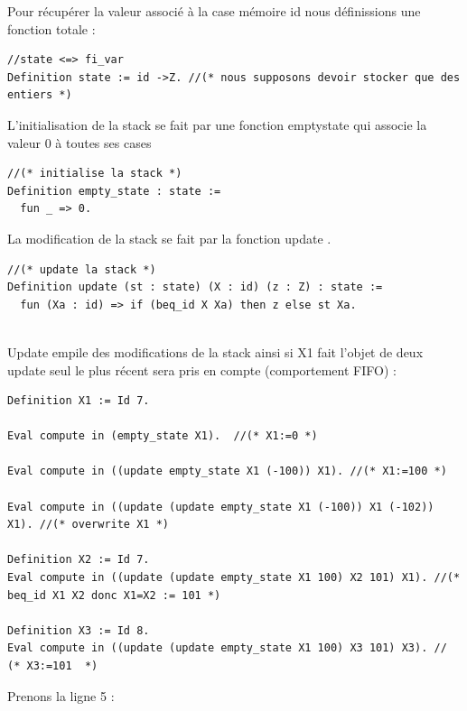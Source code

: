 \documentclass{article}
\begin{document}
\medskip

\noindent Pour récupérer la valeur associé à la case mémoire id nous définissions une fonction totale :

\begin{lstlisting}[style=CStyle]
//state <=> fi_var 
Definition state := id ->Z. //(* nous supposons devoir stocker que des entiers *)
\end{lstlisting}

\medskip

\noindent L'initialisation de la stack se fait par une fonction empty\textunderscore state qui associe la valeur 0 à toutes ses cases 


\begin{lstlisting}[style=CStyle]
//(* initialise la stack *)
Definition empty_state : state := 
  fun _ => 0.
\end{lstlisting}


\medskip

\noindent La modification de la stack se fait par la fonction update .


\begin{lstlisting}[style=CStyle]
//(* update la stack *)
Definition update (st : state) (X : id) (z : Z) : state :=
  fun (Xa : id) => if (beq_id X Xa) then z else st Xa. 
  
\end{lstlisting}

\noindent Update empile des modifications de la stack ainsi si X1 fait l'objet de deux update seul le plus récent sera pris en compte (comportement FIFO) :

\begin{lstlisting}[style=CStyle]
Definition X1 := Id 7.

Eval compute in (empty_state X1).  //(* X1:=0 *)

Eval compute in ((update empty_state X1 (-100)) X1). //(* X1:=100 *)

Eval compute in ((update (update empty_state X1 (-100)) X1 (-102)) X1). //(* overwrite X1 *)

Definition X2 := Id 7.
Eval compute in ((update (update empty_state X1 100) X2 101) X1). //(* beq_id X1 X2 donc X1=X2 := 101 *)

Definition X3 := Id 8.
Eval compute in ((update (update empty_state X1 100) X3 101) X3). // (* X3:=101  *)

\end{lstlisting}

Prenons la ligne 5 :
\end{document}
